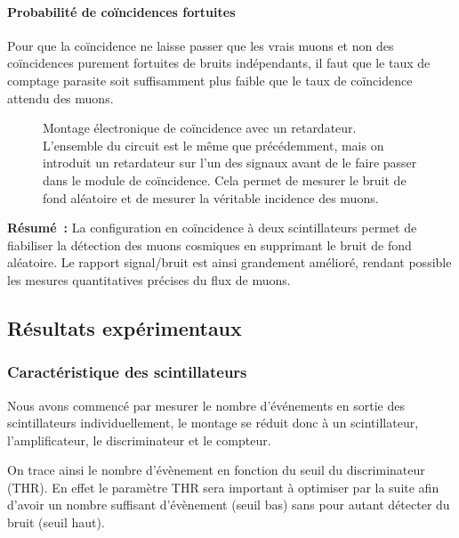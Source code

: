 \documentclass[a4paper,12pt,twoside]{article}
\begin{document}
\paragraph{Probabilité de coïncidences fortuites}

Pour que la coïncidence ne laisse passer que les \og vrais\fg{} muons et non des coïncidences purement fortuites de bruits indépendants, il faut que le taux de comptage parasite soit suffisamment plus faible que le taux de coïncidence attendu des muons.

\begin{figure}[H]
    \centering
    
    \caption{Montage électronique de coïncidence avec un retardateur. L'ensemble du circuit est le même que précédemment, mais on introduit 
    un retardateur sur l'un des signaux avant de le faire passer dans le module de coïncidence. Cela permet de mesurer le bruit de fond aléatoire et de mesurer la véritable incidence des muons.}
    \label{fig:coincidence_avec_delais}
\end{figure}
\vspace{1em}
\begin{remarque}
\textbf{Résumé~:} La configuration en coïncidence à deux scintillateurs permet de fiabiliser la détection des muons cosmiques en supprimant le bruit de fond aléatoire. Le rapport signal/bruit est ainsi grandement amélioré, rendant possible les mesures quantitatives précises du flux de muons.
\end{remarque}

\vspace{1em}
\noindent

\subsection{Résultats expérimentaux}
\subsubsection{Caractéristique des scintillateurs}
Nous avons commencé par mesurer le nombre d’événements en sortie des scintillateurs individuellement, le montage se réduit donc à un scintillateur, l’amplificateur, le discriminateur et le compteur.

On trace ainsi le nombre d’évènement en fonction du seuil du discriminateur (THR). En effet le paramètre THR sera important à optimiser par la suite afin d’avoir un nombre suffisant d’évènement (seuil bas) sans pour autant détecter du bruit (seuil haut).
\end{document}
